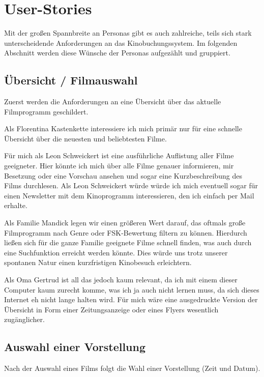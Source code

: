 \section{User-Stories}

Mit der großen Spannbreite an Personas gibt es auch zahlreiche, teils sich stark unterscheidende Anforderungen an das Kinobuchungssystem.
Im folgenden Abschnitt werden diese Wünsche der Personas aufgezählt und gruppiert.

\subsection{Übersicht / Filmauswahl}
Zuerst werden die Anforderungen an eine Übersicht über das aktuelle Filmprogramm geschildert.

Als Florentina Kastenkette interessiere ich mich primär nur für eine schnelle Übersicht über die neuesten und beliebtesten Filme.

Für mich als Leon Schweickert ist eine ausführliche Auflistung aller Filme geeigneter.
Hier könnte ich mich über alle Filme genauer informieren, mir Besetzung oder eine Vorschau ansehen und sogar eine Kurzbeschreibung des Films durchlesen.
Als Leon Schweickert würde würde ich mich eventuell sogar für einen Newsletter mit dem Kinoprogramm interessieren, den ich einfach per Mail erhalte.

Als Familie Mandick legen wir einen größeren Wert darauf, das oftmals große Filmprogramm nach Genre oder \acs{FSK}-Bewertung filtern zu können.
Hierdurch ließen sich für die ganze Familie geeignete Filme schnell finden, was auch durch eine Suchfunktion erreicht werden könnte.
Dies würde uns trotz unserer spontanen Natur einen kurzfristigen Kinobesuch erleichtern.

Als Oma Gertrud ist all das jedoch kaum relevant, da ich mit einem dieser Computer kaum zurecht komme, was ich ja auch nicht lernen muss, da sich dieses Internet eh nicht lange halten wird.
Für mich wäre eine ausgedruckte Version der Übersicht in Form einer Zeitungsanzeige oder eines Flyers wesentlich zugänglicher.

\subsection{Auswahl einer Vorstellung}
Nach der Auswahl eines Films folgt die Wahl einer Vorstellung (Zeit und Datum).

